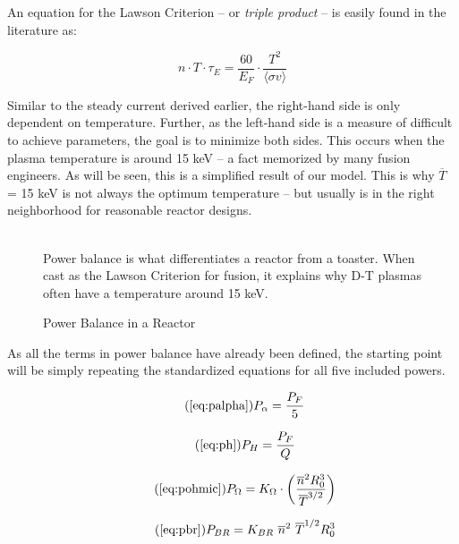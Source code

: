 An equation for the Lawson Criterion -- or \emph{triple product} -- is easily found in the literature as:

\begin{equation}
	\label{eq:lawson}
	n \cdot T \cdot \tau_E = \frac{ 60 }{ E_F } \cdot \frac{ T ^ 2 }{ \langle \sigma v \rangle }
\end{equation}

Similar to the steady current derived earlier, the right-hand side is only dependent on temperature. Further, as the left-hand side is a measure of difficult to achieve parameters, the goal is to minimize both sides. This occurs when the plasma temperature is around 15 keV -- a fact memorized by many fusion engineers. As will be seen, this is a simplified result of our model. This is why $\overline T$ = 15 keV is not always the optimum temperature -- but usually is in the right neighborhood for reasonable reactor designs.

\begin{figure}
	\centering
	\begin{adjustbox}{width=0.75\textwidth}
		
	\end{adjustbox}
	\caption{Power Balance in a Reactor} ~\\
	\small Power balance is what differentiates a reactor from a toaster. When cast as the Lawson Criterion for fusion, it explains why D-T plasmas often have a temperature around 15 keV.
\end{figure}

As all the terms in power balance have already been defined, the starting point will be simply repeating the standardized equations for all five included powers.

\begin{equation}
	\tag{\ref{eq:palpha}}
	P_\alpha = \frac{P_F}{5}
\end{equation}

\begin{equation}
	\tag{\ref{eq:ph}}
	P_H = \frac{P_F}{Q}
\end{equation}

\begin{equation}
	\tag{\ref{eq:pohmic}}
	P_\Omega = K_\Omega \cdot \left( \frac{ \overline n ^ 2 R_0^3 }{\overline T ^ {3/2}} \right)
\end{equation}

\begin{equation}
	\tag{\ref{eq:pbr}}
	P_{BR} = K_{BR} \ \overline n ^ 2 \ \overline T ^ {1/2} R_0^3 
\end{equation}

